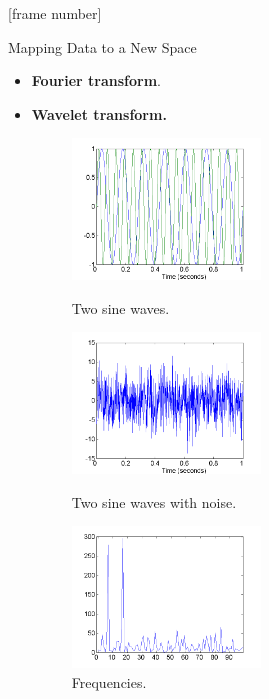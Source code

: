 \documentclass[aspectratio=169,t]{beamer}
\begin{document}
  {
    [frame number]
    \begin{frame}{Mapping Data to a New Space}
    \begin{itemize}
      \item \textbf{Fourier transform}.
      \item \textbf{Wavelet transform.}

    \begin{figure}
      \centering
      \begin{minipage}[b]{0.30\textwidth}
        \includegraphics[width=5cm]{img/twosinewaves.png}
        \caption{Two sine waves.}
      \end{minipage}\hfill
      \begin{minipage}[b]{0.30\textwidth}
        \includegraphics[width=5cm]{img/twosinewaveswithnoise.png}
        \caption{Two sine waves with noise.}
      \end{minipage}\hfill
      \begin{minipage}[b]{0.30\textwidth}
        \includegraphics[width=5cm]{img/frequencies.png}
        \caption{Frequencies.}
      \end{minipage}
    \end{figure}
    \end{itemize}
    \end{frame}
  }
\end{document}
